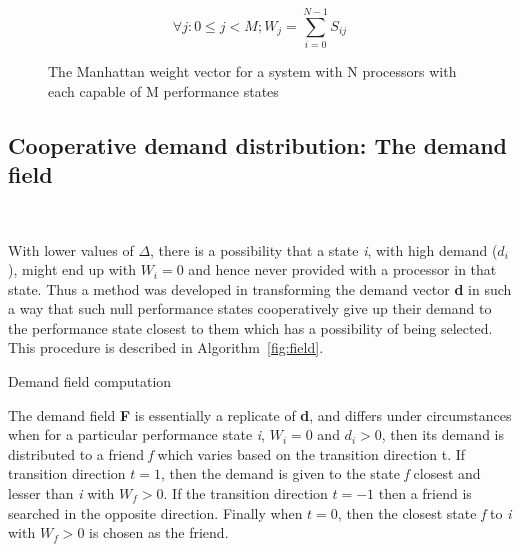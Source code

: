 \begin{figure}[h!]
\centering
\begin{equation*}
    \forall j: 0 \leq j < M; W_j = \displaystyle\sum_{i=0}^{N-1} {S_{ij}}
\end{equation*}
\caption{The Manhattan weight vector for a system with N processors with each capable of M performance states}
\label{fig:state_weight}
\end{figure}

\subsection{Cooperative demand distribution: The demand field}~\label{sec:field}

With lower values of $\Delta$, there is a possibility that a state \textit{i}, with 
high demand ($d_i$), might end up with $W_i = 0$ and hence never provided with a processor
in that state. Thus a method was developed in transforming the demand vector \textbf{d}
in such a way that such null performance states cooperatively give up their demand
to the performance state closest to them which has a possibility of being selected. 
This procedure is described in Algorithm~\ref{fig:field}.


\begin{algorithm}[h!]
 \SetLine
\caption{Demand field computation}
\label{fig:field}
\end{algorithm}


The demand field \textbf{F} is essentially a replicate of \textbf{d}, and differs under
circumstances when for a particular performance state \textit{i}, $W_i = 0$ and $d_i > 0$,
then its demand is distributed to a friend \textit{f} which varies based on the transition
direction t. If transition direction $t = 1$, then the demand is given to the state \textit{f} closest and lesser than
\textit{i} with $W_f > 0$. If the transition direction $t = -1$ then a friend is searched in 
the opposite direction. Finally when $t = 0$, then the closest state \textit{f} to \textit{i} with $W_f > 0$ is chosen as the 
friend. 

